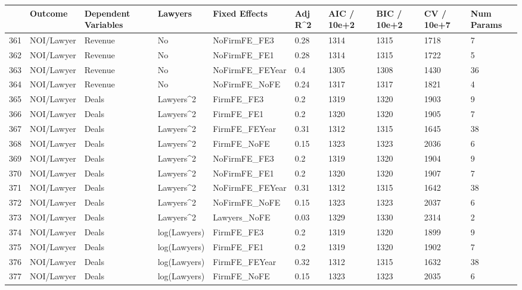 \begin{table}[ht]
\centering
\begin{tabular}{rlllllllll}
  \hline
 & Outcome & Dependent Variables & Lawyers & Fixed Effects & Adj R^2 & AIC / 10e+2 & BIC / 10e+2 & CV / 10e+7 & Num Params \\ 
  \hline
361 & NOI/Lawyer & Revenue & No & NoFirmFE\_FE3 & 0.28 & 1314 & 1315 & 1718 & 7 \\ 
  362 & NOI/Lawyer & Revenue & No & NoFirmFE\_FE1 & 0.28 & 1314 & 1315 & 1722 & 5 \\ 
  363 & NOI/Lawyer & Revenue & No & NoFirmFE\_FEYear & 0.4 & 1305 & 1308 & 1430 & 36 \\ 
  364 & NOI/Lawyer & Revenue & No & NoFirmFE\_NoFE & 0.24 & 1317 & 1317 & 1821 & 4 \\ 
  365 & NOI/Lawyer & Deals & Lawyers^2 & FirmFE\_FE3 & 0.2 & 1319 & 1320 & 1903 & 9 \\ 
  366 & NOI/Lawyer & Deals & Lawyers^2 & FirmFE\_FE1 & 0.2 & 1320 & 1320 & 1905 & 7 \\ 
  367 & NOI/Lawyer & Deals & Lawyers^2 & FirmFE\_FEYear & 0.31 & 1312 & 1315 & 1645 & 38 \\ 
  368 & NOI/Lawyer & Deals & Lawyers^2 & FirmFE\_NoFE & 0.15 & 1323 & 1323 & 2036 & 6 \\ 
  369 & NOI/Lawyer & Deals & Lawyers^2 & NoFirmFE\_FE3 & 0.2 & 1319 & 1320 & 1904 & 9 \\ 
  370 & NOI/Lawyer & Deals & Lawyers^2 & NoFirmFE\_FE1 & 0.2 & 1320 & 1320 & 1907 & 7 \\ 
  371 & NOI/Lawyer & Deals & Lawyers^2 & NoFirmFE\_FEYear & 0.31 & 1312 & 1315 & 1642 & 38 \\ 
  372 & NOI/Lawyer & Deals & Lawyers^2 & NoFirmFE\_NoFE & 0.15 & 1323 & 1323 & 2037 & 6 \\ 
  373 & NOI/Lawyer & Deals & Lawyers^2 & Lawyers\_NoFE & 0.03 & 1329 & 1330 & 2314 & 2 \\ 
  374 & NOI/Lawyer & Deals & log(Lawyers) & FirmFE\_FE3 & 0.2 & 1319 & 1320 & 1899 & 9 \\ 
  375 & NOI/Lawyer & Deals & log(Lawyers) & FirmFE\_FE1 & 0.2 & 1319 & 1320 & 1902 & 7 \\ 
  376 & NOI/Lawyer & Deals & log(Lawyers) & FirmFE\_FEYear & 0.32 & 1312 & 1315 & 1632 & 38 \\ 
  377 & NOI/Lawyer & Deals & log(Lawyers) & FirmFE\_NoFE & 0.15 & 1323 & 1323 & 2035 & 6 \\ 

\end{tabular}
\end{table}
